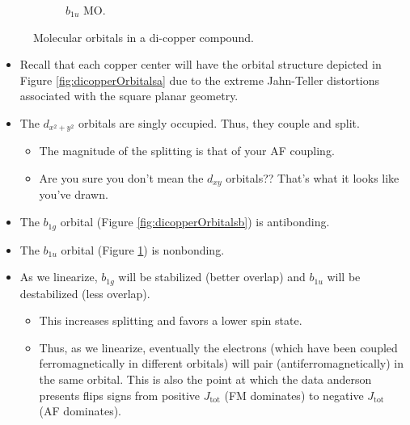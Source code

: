 \documentclass[../notes.tex]{subfiles}
\begin{document}
\begin{itemize}
\begin{figure}[H]
\begin{subfigure}[b]{0.3\linewidth}
            \caption{$b_{1u}$ MO.}
            \label{fig:dicopperOrbitalsc}
        \end{subfigure}
        \caption{Molecular orbitals in a di-copper compound.}
        \label{fig:dicopperOrbitals}
    \end{figure}
    \begin{itemize}
        \item Recall that each copper center will have the orbital structure depicted in Figure \ref{fig:dicopperOrbitalsa} due to the extreme Jahn-Teller distortions associated with the square planar geometry.
        \item The $d_{x^2+y^2}$ orbitals are singly occupied. Thus, they couple and split.
        \begin{itemize}
            \item The magnitude of the splitting is that of your AF coupling.
            \item Are you sure you don't mean the $d_{xy}$ orbitals?? That's what it looks like you've drawn.
        \end{itemize}
        \item The $b_{1g}$ orbital (Figure \ref{fig:dicopperOrbitalsb}) is antibonding.
        \item The $b_{1u}$ orbital (Figure \ref{fig:dicopperOrbitalsc}) is nonbonding.
        \item As we linearize, $b_{1g}$ will be stabilized (better overlap) and $b_{1u}$ will be destabilized (less overlap).
        \begin{itemize}
            \item This increases splitting and favors a lower spin state.
            \item Thus, as we linearize, eventually the electrons (which have been coupled ferromagnetically in different orbitals) will pair (antiferromagnetically) in the same orbital. This is also the point at which the data anderson presents flips signs from positive $J_\text{tot}$ (FM dominates) to negative $J_\text{tot}$ (AF dominates).

\end{itemize}
\end{itemize}
\end{itemize}
\end{document}
